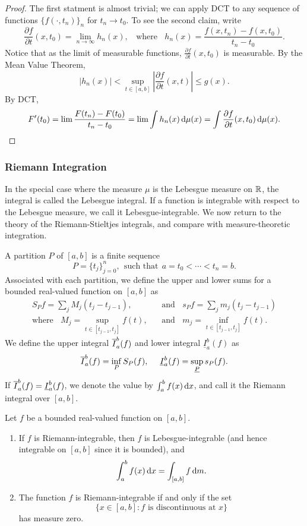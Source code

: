 \documentclass[12pt]{article} %
\begin{document}
\begin{proof}
    The first statment is almost trivial; we can apply DCT to any sequence of functions $\{f(\cdot, t_n)\}_n$ for $t_n \to t_0$. To see the second claim, write \[\frac{\partial f}{\partial t}(x, t_0) = \lim_{n \to \infty} h_n(x), \ \ \ \ \text{where} \ \ \ \ h_n(x) = \frac{f(x, t_n) - f(x, t_0)}{t_n - t_0}.\] Notice that as the limit of measurable functions, $\frac{\partial f}{\partial t}(x, t_0)$ is measurable. By the Mean Value Theorem, \[|h_n(x)| < \sup_{t \in [a,b]} \left|\frac{\partial f}{\partial t} (x, t) \right| \leq g(x).\] By DCT, \[F'(t_0) = \lim \frac{F(t_n) - F(t_0)}{t_n - t_0} = \lim \int h_n(x) \, \mathrm{d} \mu(x) = \int \frac{\partial f}{\partial t} (x, t_0) \, \mathrm{d} \mu(x).\]
\end{proof}

\subsubsection{Riemann Integration}

In the special case where the measure $\mu$ is the Lebesgue measure on $\mathbb{R}$, the integral is called the Lebesgue integral. If a function is integrable with respect to the Lebesgue measure, we call it Lebesgue-integrable. We now return to the theory of the Riemann-Stieltjes integrals, and compare with measure-theoretic integration.

\begin{definition}
    A partition $P$ of $[a, b]$ is a finite sequence \[P = \{t_j\}_{j=0}^{n}, \ \ \text{such that} \ \ a =t_0 < \cdots < t_n = b.\] Associated with each partition, we define the upper and lower sums for a bounded real-valued function on $[a, b]$ as \begin{align*}
        S_{P}f = \sum_j M_j(t_j - t_{j-1}), \ \ \ \ &\text{and} \ \ \ \ s_{P}f = \sum_j m_j (t_j - t_{j-1})\\
        \text{where} \ \ \ \ M_j = \sup_{t \in [t_{j-1}, t_j]}f(t), \ \ \ \ &\text{and} \ \ \ \ m_j = \inf_{t \in [t_{j-1}, t_j]}f(t).
    \end{align*} We define the upper integral $\overline{I}_a^b(f)$ and lower integral $\underline{I}_a^b(f)$ as \[\ol{I}_a^b(f) = \inf_{P} S_P (f), \ \ \ \ \underline{I}_a^b(f) = \sup_{\underline{P}}s_P(f).\] If $\overline{I}_a^b(f) = \underline{I}_a^b(f)$, we denote the value by $\int_a^b f(x) \, \mathrm{d} x$, and call it the Riemann integral over $[a, b]$.
\end{definition}

\begin{theorem}
    Let $f$ be a bounded real-valued function on $[a, b]$. \begin{enumerate}
        \item If $f$ is Riemann-integrable, then $f$ is Lebesgue-integrable (and hence integrable on $[a,b]$ since it is bounded), and \[\int_a^b f(x) \, \mathrm{d} x = \int_{[a, b]} f \, \mathrm{d} m.\]
        \item The function $f$ is Riemann-integrable if and only if the set \[\{x \in [a, b] : \text{$f$ is discontinuous at $x$}\}\] has measure zero.
    \end{enumerate}
\end{theorem}
\end{document}
